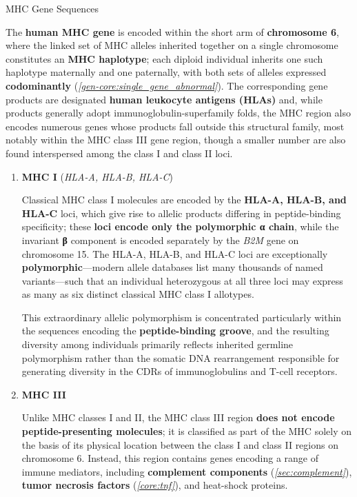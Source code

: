     \begin{core}{MHC Gene Sequences}

      The \textbf{human MHC gene} is encoded within the short arm of \textbf{chromosome 6}, where the linked set of MHC alleles inherited together on a single chromosome constitutes an \textbf{MHC haplotype}; each diploid individual inherits one such haplotype maternally and one paternally, with both sets of alleles expressed \textbf{codominantly} (\textit{\autoref{gen-core:single_gene_abnormal}}). The corresponding gene products are designated \textbf{human leukocyte antigens (HLAs)} and, while products generally adopt immunoglobulin-superfamily folds, the MHC region also encodes numerous genes whose products fall outside this structural family, most notably within the MHC class III gene region, though a smaller number are also found interspersed among the class I and class II loci.


      \begin{enumerate}

        \item \textbf{MHC I} (\textit{HLA-A, HLA-B, HLA-C})

          Classical MHC class I molecules are encoded by the \textbf{HLA-A, HLA-B, and HLA-C} loci, which give rise to allelic products differing in peptide-binding specificity; these \textbf{loci encode only the polymorphic α chain}, while the invariant \textbf{β} component is encoded separately by the \textit{B2M} gene on chromosome 15. The HLA-A, HLA-B, and HLA-C loci are exceptionally \textbf{polymorphic}---modern allele databases list many thousands of named variants---such that an individual heterozygous at all three loci may express as many as six distinct classical MHC class I allotypes.

          This extraordinary allelic polymorphism is concentrated particularly within the sequences encoding the \textbf{peptide-binding groove}, and the resulting diversity among individuals primarily reflects inherited germline polymorphism rather than the somatic DNA rearrangement responsible for generating diversity in the CDRs of immunoglobulins and T-cell receptors.

        \item \textbf{MHC III}

          Unlike MHC classes I and II, the MHC class III region \textbf{does not encode peptide-presenting molecules}; it is classified as part of the MHC solely on the basis of its physical location between the class I and class II regions on chromosome 6. Instead, this region contains genes encoding a range of immune mediators, including \textbf{complement components} (\textit{\autoref{sec:complement}}), \textbf{tumor necrosis factors} (\textit{\autoref{core:tnf}}), and heat-shock proteins.


\end{enumerate}
\end{core}
